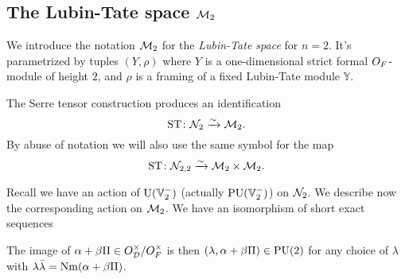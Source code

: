 \subsection{The Lubin-Tate space $\mathcal M_2$}
We introduce the notation $\mathcal M_2$ for the \emph{Lubin-Tate space} for $n = 2$.
It's parametrized by tuples $(Y, \rho)$
where $Y$ is a one-dimensional strict formal $O_F$-module of height $2$,
and $\rho$ is a framing of a fixed Lubin-Tate module $\mathbb{Y}$.

\begin{proposition}
  The Serre tensor construction produces an identification
  \[ \operatorname{ST} \colon \mathcal N_2 \xrightarrow{\sim} \mathcal M_2. \]
  By abuse of notation we will also use the same symbol for the map
  \[ \operatorname{ST} \colon \mathcal N_{2,2} \xrightarrow{\sim} \mathcal M_2 \times \mathcal M_2. \]
\end{proposition}

Recall we have an action of $\operatorname{U}(\mathbb V_2^-)$ (actually $\operatorname{PU}(\mathbb V_2^-)$) on $\mathcal N_2$.
We describe now the corresponding action on $\mathcal M_2$.
We have an isomorphism of short exact sequences
\begin{center}
\end{center}
The image of $\alpha + \beta \Pi \in O_\mathcal D^\times / O_F^\times$
is then $(\lambda, \alpha + \beta \Pi) \in \operatorname{PU}(2)$
for any choice of $\lambda$ with $\lambda \bar \lambda = \operatorname{Nm} (\alpha + \beta \Pi)$.

